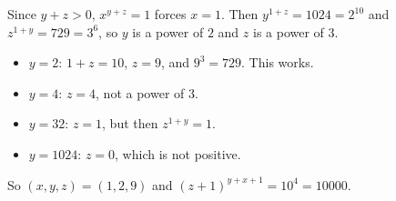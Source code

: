 Since $y+z>0$, $x^{y+z}=1$ forces $x=1$. Then $y^{1+z}=1024=2^{10}$ and $z^{1+y}=729=3^6$, so $y$ is a power of $2$ and $z$ is a power of $3$.
\begin{itemize}
\item $y=2$: $1+z=10$, $z=9$, and $9^{3}=729$. This works.
\item $y=4$: $z=4$, not a power of $3$.
\item $y=32$: $z=1$, but then $z^{1+y}=1$.
\item $y=1024$: $z=0$, which is not positive.
\end{itemize}
So $(x,y,z)=(1,2,9)$ and $(z+1)^{y+x+1}=10^4=\boxed{10000}$.
